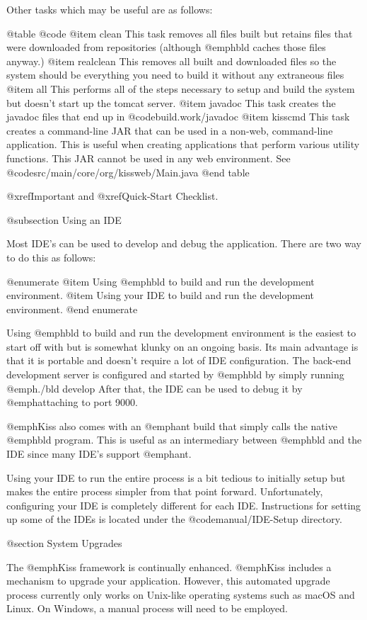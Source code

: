 Other tasks which may be useful are as follows:

@table @code
@item clean
This task removes all files built but retains files that were downloaded from
repositories (although @emph{bld} caches those files anyway.)
@item realclean
This removes all built and downloaded files so the system should be everything
you need to build it without any extraneous files
@item all
This performs all of the steps necessary to setup and build the system but
doesn't start up the tomcat server.
@item javadoc
This task creates the javadoc files that end up in @code{build.work/javadoc}
@item kisscmd
This task creates a command-line JAR that can be used in a non-web, command-line application.
This is useful when creating applications that perform various utility functions.  This
JAR cannot be used in any web environment.  See @code{src/main/core/org/kissweb/Main.java}
@end table

@xref{Important} and @xref{Quick-Start Checklist}.

@subsection Using an IDE

Most IDE's can be used to develop and debug the application.  There are two
way to do this as follows:

@enumerate
@item
Using @emph{bld} to build and run the development environment.
@item
Using your IDE to build and run the development environment.
@end enumerate

Using @emph{bld} to build and run the development environment is the
easiest to start off with but is somewhat klunky on an ongoing basis.
Its main advantage is that it is portable and doesn't require a lot of
IDE configuration.  The back-end development server is configured and
started by @emph{bld} by simply running @emph{./bld develop} After
that, the IDE can be used to debug it by @emph{attaching} to port
9000.

@emph{Kiss} also comes with an @emph{ant} build that simply calls the
native @emph{bld} program.  This is useful as an intermediary between
@emph{bld} and the IDE since many IDE's support @emph{ant}.

Using your IDE to run the entire process is a bit tedious to initially
setup but makes the entire process simpler from that point forward.
Unfortunately, configuring your IDE is completely different for each
IDE.  Instructions for setting up some of the IDEs is located under the
@code{manual/IDE-Setup} directory.


@section System Upgrades

The @emph{Kiss} framework is continually enhanced.  @emph{Kiss}
includes a mechanism to upgrade your application.  However, this
automated upgrade process currently only works on Unix-like operating
systems such as macOS and Linux.  On Windows, a manual process will
need to be employed.

